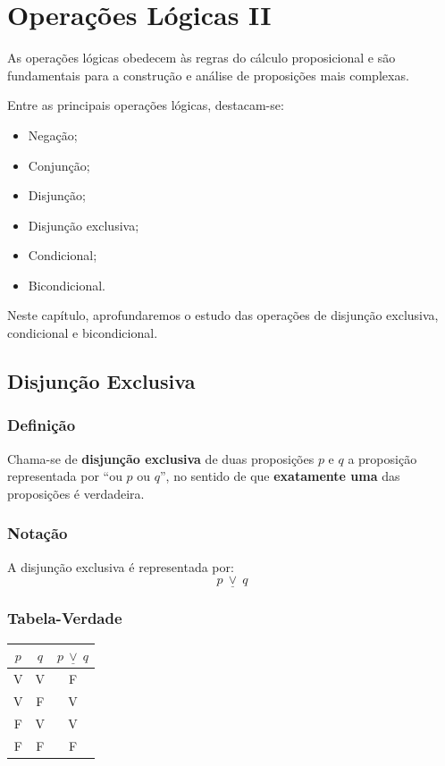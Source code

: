 \chapter{Operações Lógicas  II}

As operações lógicas obedecem às regras do cálculo proposicional e são fundamentais para a construção e análise de proposições mais complexas.

Entre as principais operações lógicas, destacam-se:
\begin{itemize}
    \item Negação;
    \item Conjunção;
    \item Disjunção;
    \item Disjunção exclusiva;
    \item Condicional;
    \item Bicondicional.
\end{itemize}

Neste capítulo, aprofundaremos o estudo das operações de disjunção exclusiva, condicional e bicondicional.

\section{Disjunção Exclusiva}

\subsection{Definição}

Chama-se de \textbf{disjunção exclusiva} de duas proposições $p$ e $q$ a proposição representada por ``ou $p$ ou $q$'', no sentido de que \textbf{exatamente uma} das proposições é verdadeira.

\subsection{Notação}

A disjunção exclusiva é representada por:
\[
p \ \underline{\vee} \ q
\]

\subsection{Tabela-Verdade}

\begin{center}
\begin{tabular}{|c|c|c|}
\hline
$p$ & $q$ & $p \ \underline{\vee} \ q$ \\
\hline
V & V & F \\
V & F & V \\
F & V & V \\
F & F & F \\
\hline
\end{tabular}
\end{center}

